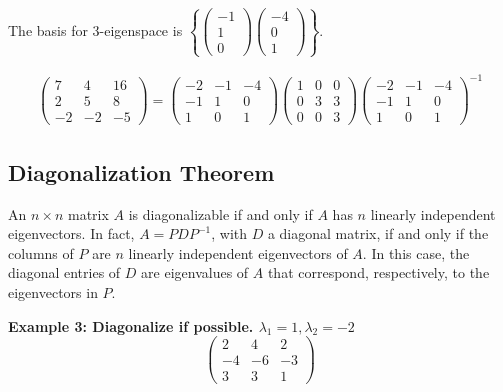 \noindent
The basis for 3-eigenspace is \(\left\{ \begin{pmatrix}
    -1 \\ 1 \\ 0
\end{pmatrix} \begin{pmatrix}
    -4 \\ 0 \\ 1
\end{pmatrix} \right\}\).

\begin{align}
    \begin{pmatrix}
        7 & 4 & 16 \\ 2 & 5 & 8 \\ -2 & -2 & -5
    \end{pmatrix} = \begin{pmatrix}
        -2 & -1 & -4 \\ -1 & 1 & 0 \\ 1 & 0 & 1
    \end{pmatrix} \begin{pmatrix}
        1 & 0 & 0 \\ 0 & 3 & 3 \\ 0 & 0 & 3
    \end{pmatrix}
    \begin{pmatrix}
        -2 & -1 & -4 \\ -1 & 1 & 0 \\ 1 & 0 & 1
    \end{pmatrix}^{-1}
\end{align}

\subsection{Diagonalization Theorem}
\begin{theorem}
    An \(n\times n\) matrix \(A\) is diagonalizable if and only if \(A\) has \(n\) linearly independent eigenvectors. In fact, \(A=PDP^{-1}\), with \(D\) a diagonal matrix, if and only if the columns of \(P\) are \(n\) linearly independent eigenvectors of \(A\). In this case, the diagonal entries of \(D\) are eigenvalues of \(A\) that correspond, respectively, to the eigenvectors in \(P\).
\end{theorem}

\noindent
\newline
\textbf{Example 3: Diagonalize if possible. \(\lambda_1=1, \lambda_2=-2\)}
\begin{equation}
    \begin{pmatrix}
        2 & 4 & 2 \\ -4 & -6 & -3 \\ 3 & 3 & 1
    \end{pmatrix}
\end{equation}

